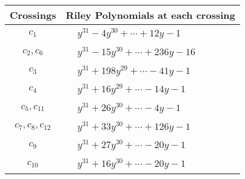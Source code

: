 \documentclass[1p]{elsarticle_modified}
\theoremstyle{definition}
\begin{document}
\begin{tabular}{m{50pt}|m{274pt}}
Crossings & \hspace{64pt}Riley Polynomials at each crossing \\
\hline $$\begin{aligned}c_{1}\end{aligned}$$&$\begin{aligned}
&y^{31}-4 y^{30}+\cdots+12 y-1
\end{aligned}$\\
\hline $$\begin{aligned}c_{2},c_{6}\end{aligned}$$&$\begin{aligned}
&y^{31}-15 y^{30}+\cdots+236 y-16
\end{aligned}$\\
\hline $$\begin{aligned}c_{3}\end{aligned}$$&$\begin{aligned}
&y^{31}+198 y^{29}+\cdots-41 y-1
\end{aligned}$\\
\hline $$\begin{aligned}c_{4}\end{aligned}$$&$\begin{aligned}
&y^{31}+16 y^{29}+\cdots-14 y-1
\end{aligned}$\\
\hline $$\begin{aligned}c_{5},c_{11}\end{aligned}$$&$\begin{aligned}
&y^{31}+26 y^{30}+\cdots-4 y-1
\end{aligned}$\\
\hline $$\begin{aligned}c_{7},c_{8},c_{12}\end{aligned}$$&$\begin{aligned}
&y^{31}+33 y^{30}+\cdots+126 y-1
\end{aligned}$\\
\hline $$\begin{aligned}c_{9}\end{aligned}$$&$\begin{aligned}
&y^{31}+27 y^{30}+\cdots-20 y-1
\end{aligned}$\\
\hline $$\begin{aligned}c_{10}\end{aligned}$$&$\begin{aligned}
&y^{31}+16 y^{30}+\cdots-20 y-1
\end{aligned}$\\
\hline
\end{tabular}\\~\\
\end{document}
